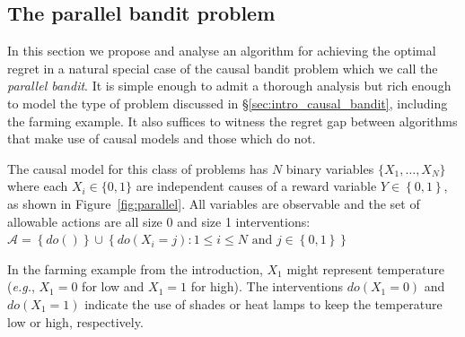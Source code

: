\documentclass[11pt,a4paper,oneside]{book}
\newcommand{\eg}{\textit{e.g.}}
\newcommand{\set}[1]{\left\{#1\right\}}
\theoremstyle{plain}
\theoremstyle{definition}
\begin{document}
\subsection{The parallel bandit problem}
\label{sec:simple-regret}
In this section we propose and analyse an algorithm for achieving the optimal regret in a natural special case of the causal bandit problem which we call the {\it parallel bandit}.
It is simple enough to admit a thorough analysis but rich enough to model the type of problem discussed in \S\ref{sec:intro_causal_bandit}, including the farming example. It also suffices to witness the regret gap between algorithms that make use of causal models and those which do not.

The causal model for this class of problems has $N$ binary variables $\{ X_1, \ldots, X_N \}$ where each $X_i \in \{0,1\}$ are independent causes of a reward variable $Y \in \set{0,1}$, as shown in Figure~\ref{fig:parallel}. All variables are observable and the set of allowable actions are all size 0 and size 1 interventions: $\mathcal{A} = \set{do()} \cup \set{ do(X_i = j) \colon 1 \leq i \leq N \text{ and } j \in \set{0,1}}$

In the farming example from the introduction, $X_1$ might represent temperature (\eg, $X_1=0$ for low and $X_1=1$ for high). The interventions $do(X_1 = 0)$ and $do(X_1 = 1)$ indicate the use of shades or heat lamps to keep the temperature low or high, respectively.
\end{document}
